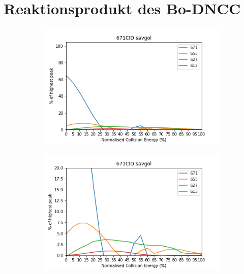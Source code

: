 \pagebreak
\section{Reaktionsprodukt des Bo-DNCC}

\begin{figure}[!htbp]
  \begin{subfigure}[b]{0.5\textwidth}
    \includegraphics[width=\textwidth]{content/Anhang/MSLeafspray/RP_Bo-DNCC/671CID-671savgol.png}
    \caption{}
  \end{subfigure}
  \hfill
  \begin{subfigure}[b]{0.5\textwidth}
    \includegraphics[width=\textwidth]{content/Anhang/MSLeafspray/RP_Bo-DNCC/671CID-671savgolv20.png}
    \caption{}
  \end{subfigure}
  

\end{figure}
